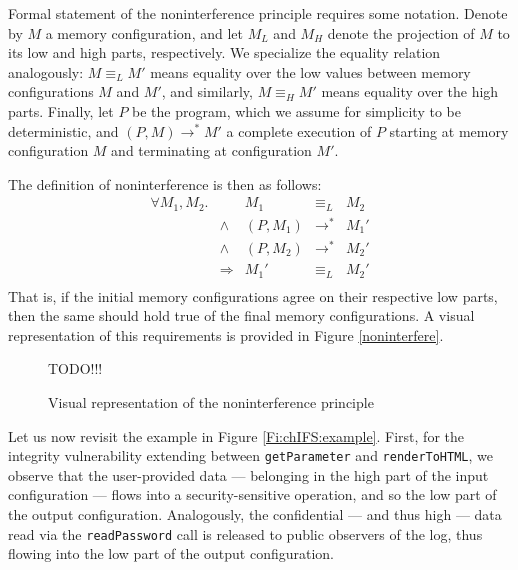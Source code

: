 Formal statement of the noninterference principle requires some notation. Denote by $M$ a memory configuration, and let $M_L$ and $M_H$ denote the projection of $M$ to its low and high parts, respectively. We specialize the equality relation analogously: $M \equiv_{L} M'$ means equality over the low values between memory configurations $M$ and $M'$, and similarly, $M \equiv_{H} M'$ means equality over the high parts. Finally, let $P$ be the program, which we assume for simplicity to be deterministic, and $(P,M) \longrightarrow^{*} M'$ a complete execution of $P$ starting at memory configuration $M$ and terminating at configuration $M'$.

The definition of noninterference is then as follows:
$$
\begin{array}{rrrcl}
\forall M_1,M_2. &  				  & M_1 & \equiv_L & M_2 \\
&  \wedge & (P,M_1) & \longrightarrow^{*} & M_1' \\ 
&  \wedge & (P,M_2) & \longrightarrow^{*} & M_2' \\
& \Longrightarrow & M_1'    & \equiv_L & M_2'  \\
\end{array}
$$
That is, if the initial memory configurations agree on their respective low parts, then the same should hold true of the final memory configurations. A visual representation of this requirements is provided in Figure \ref{noninterfere}. 

\begin{figure}
	TODO!!!
	\caption{Visual representation of the noninterference principle}
\end{figure}

Let us now revisit the example in Figure \ref{Fi:chIFS:example}. First, for the integrity vulnerability extending between {\tt getParameter} and {\tt renderToHTML}, we observe that 
the user-provided data --- belonging in the high part of the input configuration --- flows into a security-sensitive operation, and so the low part of the output configuration. Analogously, the confidential --- and thus high --- data read via the {\tt readPassword} call is released to public observers of the log, thus flowing into the low part of the output configuration.